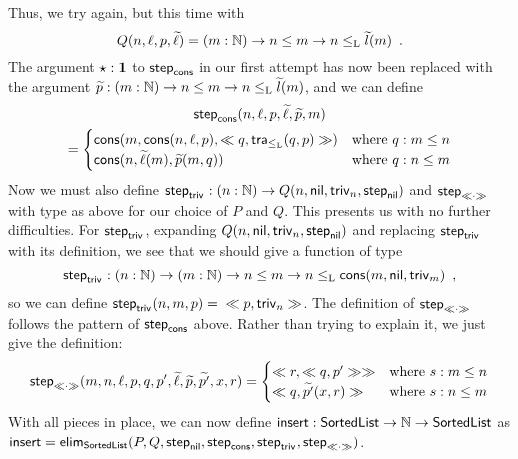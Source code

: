 \documentclass{schwicht}
\begin{document}
\begin{example}
Thus, we try again, but this time with 
\[
Q(n, \ell, p,\stepindarg{\ell})
   = (m : \Nat) \to n \leq m \to n \lessList \stepindarg{l}(m) \enspace .
\]
The argument $\oneelt : \one$ to $\stepind{\consListbare}$ in our
first attempt has now been replaced with the argument $\stepindarg{p}
: (m : \Nat) \to n \leq m \to n \lessList \stepindarg{l}(m)$, and we can define
\begin{multline*}
\stepind{\consListbare}(n, \ell, p, \stepindarg{\ell}, \stepindarg{p}, m) \\=
\begin{cases}
  \consList{m}{\consList{n}{\ell}{p}}{\consLess{m}{n}{\ell}{p}{q}{\lessListtrans{q}{p}}} & \text{where $q : m \leq n$} \\
  \consList{n}{\stepindarg{\ell}(m)}{\stepindarg{p}(m, q)} & \text{where $q : n \leq m$} 
\end{cases}
\end{multline*}
%
Now we must also define $\stepind{\nilLess{}} : (n : \Nat) \to Q(n,
\nilList, \nilLess{n}, \stepind{\nilList})$ and
$\stepind{\consLessbare}$ with type as above for our choice of $P$ and
$Q$. This presents us with no further difficulties. For
$\stepind{\nilLess{}}$, expanding $Q(n, \nilList, \nilLess{n},
\stepind{\nilList})$ and replacing $\stepind{\nilLess{}}$ with its
definition, we see that we should give a function of type
\[
\stepind{\nilLess{}} : (n : \Nat) \to (m : \Nat) \to n \leq m \to n
\lessList \consList{m}{\nilList}{\nilLess{m}} \enspace ,
\]
so we can define $\stepind{\nilLess{}}(n, m, p) = {}
\consLess{n}{m}{\nilList}{\nilLess{m}}{p}{\nilLess{n}}$. The
definition of $\stepind{\consLessbare}$ follows the pattern of $\stepind{\consListbare}$
above. Rather than trying to explain it, we just give the definition:
\[
\stepind{\consLessbare}(m, n, \ell, p, q, p', \stepindarg{\ell}, \stepindarg{p}, \stepindarg{p'}, x, r) =
\begin{cases}
  \consLess{m}{x}{\consList{n}{\ell}{p}}{\consLess{m}{n}{\ell}{p}{s}{\lessListtrans{s}{p}}}{r}{\consLess{m}{n}{\ell}{p}{q}{p'}} & \text{where $s : m \leq n$} \\
  \consLess{m}{n}{p'}{\stepindarg{p}(x, s)}{q}{\stepindarg{p'}(x, r)} & \text{where $s : n \leq m$} 
\end{cases}
\]
%
With all pieces in place, we can now define $\Listinsert : \SortedList
\to \Nat \to \SortedList$ as $\Listinsert = \elim_{\SortedList}(P, Q,
\stepind{\nilList}, \stepind{\consListbare}, \stepind{\nilLess{}},
\stepind{\consLessbare})$.
\blackqed
\end{example}
\end{document}
